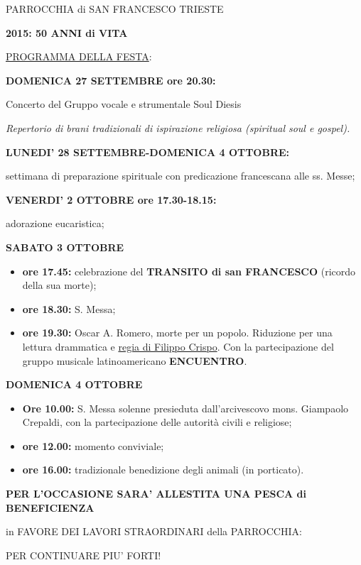 \documentclass[17pt,titlepage,extrafontsizes]{memoir}
\begin{document}
\pagestyle{empty}
\begin{center}
{\LARGE PARROCCHIA di SAN FRANCESCO TRIESTE\par
\vspace{1cm}
\textbf{2015: 50 ANNI di VITA}}
\end{center}
\vfill
{\Large \ul{PROGRAMMA DELLA FESTA}:}
\par\bigskip\bigskip
\textbf{\Large DOMENICA 27 SETTEMBRE ore 20.30:}
\par\medskip
{\large Concerto del  Gruppo vocale e strumentale Soul Diesis\par}
\textit{Repertorio di brani tradizionali di ispirazione religiosa (spiritual soul e gospel).}
\par\bigskip\bigskip
\textbf{\Large LUNEDI’ 28 SETTEMBRE-DOMENICA 4 OTTOBRE:}
\par\medskip
{\large settimana di preparazione spirituale con predicazione francescana alle ss. Messe;}
\par\bigskip\bigskip
\textbf{\Large VENERDI’ 2 OTTOBRE ore 17.30-18.15:}
\par\medskip
{\large adorazione eucaristica;}
\par\bigskip\bigskip
\textbf{\Large SABATO 3 OTTOBRE}
\par\medskip
\begin{itemize}
 \large
 \item \textbf{ore 17.45:} celebrazione del \textbf{TRANSITO di san FRANCESCO} (ricordo della sua morte);
 \item \textbf{ore 18.30:} S. Messa;
 \item \textbf{ore 19.30:} Oscar A. Romero, morte per un popolo. Riduzione per una lettura drammatica e \ul{regia di Filippo Crispo}. Con la partecipazione del gruppo musicale latinoamericano \textbf{ENCUENTRO}.
\end{itemize}
\par\bigskip\bigskip
\textbf{\Large DOMENICA 4 OTTOBRE}
\par\medskip
\begin{itemize}
 \large
 \item \textbf{Ore 10.00:} S. Messa solenne presieduta dall’arcivescovo mons. Giampaolo Crepaldi, con la partecipazione delle autorità civili e religiose;
 \item \textbf{ore 12.00:} momento conviviale;
 \item \textbf{ore 16.00:} tradizionale benedizione degli animali (in porticato).
\end{itemize}
\vfill
\begin{center}
\large\bfseries 
PER L’OCCASIONE SARA’ ALLESTITA UNA PESCA di BENEFICIENZA\par
in FAVORE DEI LAVORI STRAORDINARI della PARROCCHIA:\par
\Large PER CONTINUARE PIU’ FORTI!
\end{center}
\vfill
\newpage
\end{document}

